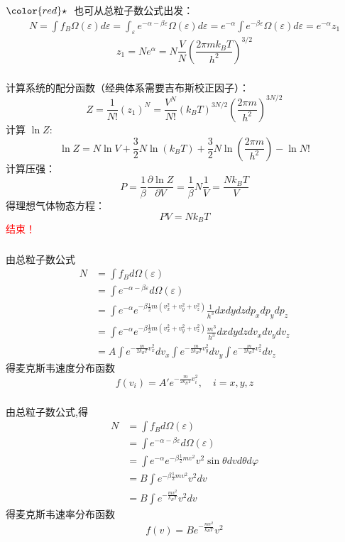 \begin{frame}[label=current]
  \frametitle{}
 ${\color{red}\star}~$ 也可从总粒子数公式出发：
  \[ \begin{aligned}
    N = \int f_{B} \Omega(\varepsilon) d \varepsilon  
    = \int_{\varepsilon} e^{-\alpha -\beta \varepsilon} \Omega(\varepsilon) d \varepsilon 
    = e^{-\alpha} \int e^{-\beta \varepsilon} \Omega(\varepsilon) d \varepsilon  = e^{-\alpha} z_1
  \end{aligned}\]
  \[z_1 =  N e^{\alpha} = N \frac{V}{N} \left( \frac{2 \pi m k_B T}{h^2} \right)^{3/2} \]
\end{frame} 
\begin{frame}
  \frametitle{}
计算系统的配分函数（经典体系需要吉布斯校正因子）：
\[ Z = \frac{1}{N!} (z_1)^N = \frac{V^N}{N!} (k_BT)^{3N/2} \left(\frac{2\pi m}{h^2}\right)^{3N/2}  \]
计算 $\ln Z$:
\[ \ln Z = N \ln V +\frac{3}{2}N \ln (k_BT) + \frac{3}{2} N \ln\left(\frac{2\pi m}{h^2}\right) - \ln N!  \]
计算压强：
\[ P= \frac{1}{\beta} \frac{\partial \ln Z}{\partial V} = \frac{1}{\beta} N \frac{1}{V} = \frac{Nk_B T }{V}\]
得理想气体物态方程：
\[ PV = Nk_B T\]
\textcolor{red}{结束！}
\end{frame} 

\begin{frame}
  \frametitle{}
  \解 
  由总粒子数公式
\[ 
  \begin{aligned}
    N &= \int f_{B} d\Omega(\varepsilon) \\ 
   &= \int e^{-\alpha -\beta \varepsilon } d\Omega(\varepsilon) \\
   &= \int e^{-\alpha }e^{-\beta \frac{1}{2}m (v_x^2 + v_y^2 + v_z^2 )} \frac{1}{h^3} dxdydzdp_xdp_y dp_z \\
   &= \int e^{-\alpha } e^{-\beta \frac{1}{2}m (v_x^2 + v_y^2 + v_z^2 )} \frac{m^3}{h^3} dxdydzdv_xdv_y dv_z \\
   &= A \int e^{-\frac{m}{2k_B T}v_x^2} d v_x \int e^{-\frac{m}{2k_B T}v_y^2} d v_y \int e^{-\frac{m}{2k_B T}v_z^2} dv_z   
  \end{aligned}  \]
  得麦克斯韦速度分布函数
  \[ f(v_i) = A' e^{-\frac{m}{2k_B T}v_i^2}, \quad  i = x,y,z  \]
\end{frame} 

\begin{frame}
  \frametitle{}
  \解 
  由总粒子数公式,得
  \[ 
  \begin{aligned}
    N &= \int f_{B} d\Omega(\varepsilon) \\ 
   &= \int e^{-\alpha -\beta \varepsilon } d\Omega(\varepsilon) \\
   &= \int e^{-\alpha }e^{-\beta \frac{1}{2}mv^2} v^2 \sin \theta d v d \theta d\varphi \\
   &= B\int e^{-\beta \frac{1}{2}mv^2} v^2 d v \\
   &= B\int e^{- \frac{mv^2}{k_BT}} v^2 d v 
  \end{aligned}  \]
  得麦克斯韦速率分布函数
  \[  f(v) = B e^{- \frac{mv^2}{k_BT}} v^2  \]
\end{frame} 

